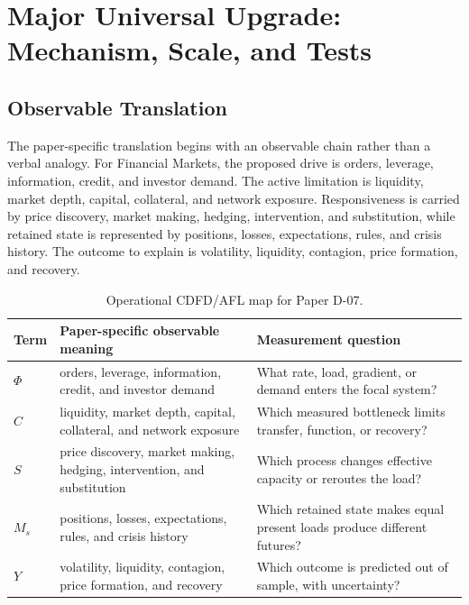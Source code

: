 \documentclass[11pt]{article}
\begin{document}
\section{Major Universal Upgrade: Mechanism, Scale, and Tests}

\subsection{Observable Translation}

The paper-specific translation begins with an observable chain rather than a
verbal analogy. For Financial Markets, the proposed drive is orders, leverage, information, credit, and investor demand.
The active limitation is liquidity, market depth, capital, collateral, and network exposure. Responsiveness is carried by
price discovery, market making, hedging, intervention, and substitution, while retained state is represented by
positions, losses, expectations, rules, and crisis history. The outcome to explain is volatility, liquidity, contagion, price formation, and recovery.

\begin{table}[htbp]
\centering
\small
\caption{Operational CDFD/AFL map for Paper D-07.}
\begin{tabularx}{\textwidth}{|l|X|X|}
\hline
\textbf{Term} & \textbf{Paper-specific observable meaning} & \textbf{Measurement question} \\
\hline
$\Phi$ & orders, leverage, information, credit, and investor demand & What rate, load, gradient, or demand enters the focal system? \\
\hline
$C$ & liquidity, market depth, capital, collateral, and network exposure & Which measured bottleneck limits transfer, function, or recovery? \\
\hline
$S$ & price discovery, market making, hedging, intervention, and substitution & Which process changes effective capacity or reroutes the load? \\
\hline
$M_s$ & positions, losses, expectations, rules, and crisis history & Which retained state makes equal present loads produce different futures? \\
\hline
$Y$ & volatility, liquidity, contagion, price formation, and recovery & Which outcome is predicted out of sample, with uncertainty? \\
\hline
\end{tabularx}
\end{table}
\end{document}
